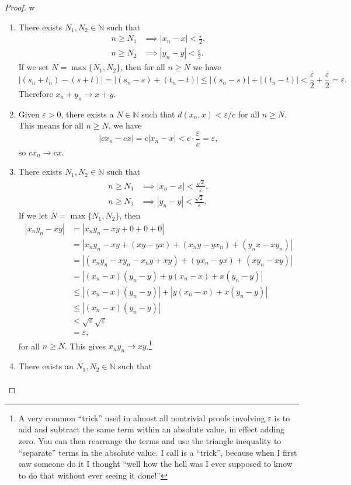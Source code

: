 \documentclass{article}
\newcommand{\N}{\mathbb{N}}
\theoremstyle{definition}
\begin{document}
\begin{proof}{\color{white}w}
\begin{enumerate}
	\item There exists $ N_1,N_2\in\N $ such that  
	\begin{align*}
	n\ge N_1&\implies |x_n-x|<\frac{\varepsilon}{2},\\
	n\ge N_2&\implies |y_n-y|<\frac{\varepsilon}{2}.
	\end{align*} 
	If we set $ N=\max\{N_1,N_2\} $, then for all $ n\ge N $ we have $$ |(s_n+t_n)-(s+t)|=|(s_n-s)+(t_n-t)|\le|(s_n-s)|+|(t_n-t)|<\frac{\varepsilon}{2}+\frac{\varepsilon}{2}=\varepsilon.$$ Therefore $ x_n+y_n\to x+y $.
	\item Given $ \varepsilon>0 $, there exists a $ N\in\N $ such that $ d(x_n,x)<\varepsilon/c$ for all $ n\ge N $. This means for all $ n\ge N $, we have $$ |cx_n-cx|=c|x_n-x|<c\cdot\frac{\varepsilon}{c}=\varepsilon ,$$ so $ cx_n\to cx $. 
	\item There exists $ N_1,N_2\in\N $ such that  
	\begin{align*}
	n\ge N_1&\implies |x_n-x|<\frac{\sqrt{2}}{\varepsilon},\\
	n\ge N_2&\implies |y_n-y|<\frac{\sqrt{2}}{\varepsilon}.
	\end{align*} 
	If we let $ N=\max\{N_1,N_2\} $, then \begin{align*}
		|x_ny_n-xy|&=|x_ny_n-xy+0+0+0|\\&=|x_ny_n-xy+(xy-yx)+(x_ny-yx_n)+(y_nx-xy_n)|\\&=|(x_ny_n-xy_n-x_ny+xy)+(yx_n-yx)+(xy_n-xy)|\\&=|(x_n-x)(y_n-y)+y(x_n-x)+x(y_n-y)|\\&\le|(x_n-x)(y_n-y)|+|y(x_n-x)+x(y_n-y)|\\&\le|(x_n-x)(y_n-y)|\\&<\sqrt{\varepsilon}\sqrt{\varepsilon}\\&=\varepsilon,
	\end{align*}
	for all $ n\ge N $. This gives $ x_ny_n\to xy $.\footnote{A very common ``trick'' used in almost all nontrivial proofs involving $ \varepsilon $ is to add and subtract the same term within an absolute value, in effect adding zero. You can then rearrange the terms and use the triangle inequality to ``separate'' terms in the absolute value. I call is a ``trick'', because when I first saw someone do it I thought ``well how the hell was I ever supposed to know to do that without ever seeing it done!''}
	\item There exists an $ N_1,N_2\in\N $ such that \begin{align*}

\end{align*}
\end{enumerate}
\end{proof}
\end{document}
